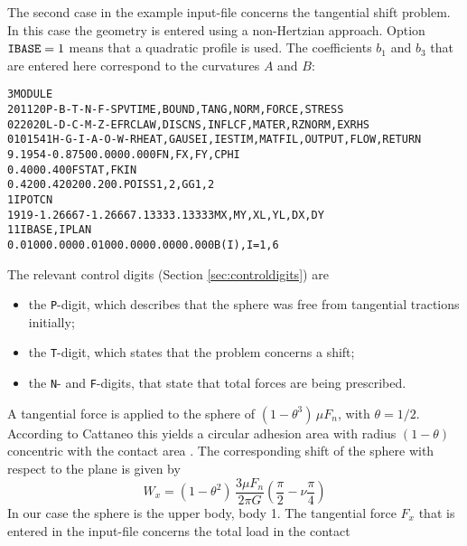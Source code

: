 \documentclass[12pt]{report}
\begin{document}
The second case in the example input-file concerns the tangential shift
problem. In this case the geometry is entered using a non-Hertzian approach.
Option ${\tt IBASE}=1$ means that a quadratic profile is used. The
coefficients $b_1$ and $b_3$ that are entered here correspond to the
curvatures $A$ and $B$:
\begin{alltt}\small
% Second case: using non-Hertzian geometry-description, and including the
%              tangential shift problem.

 3  MODULE
  201120     P-B-T-N-F-S        PVTIME, BOUND , TANG  , NORM , FORCE, STRESS
  022020     L-D-C-M-Z-E        FRCLAW, DISCNS, INFLCF, MATER, RZNORM, EXRHS
 0101541   H-G-I-A-O-W-R  HEAT, GAUSEI, IESTIM, MATFIL, OUTPUT, FLOW, RETURN
  9.1954     -0.8750       0.000       0.000         FN, FX, FY, CPHI
  0.400       0.400                                  FSTAT, FKIN
  0.420       0.420          200.        200.        POISS 1,2,  GG 1,2
    1                                                IPOTCN
   19   19  -1.26667  -1.26667   .13333     .13333   MX,MY,XL,YL,DX,DY
    1    1                                           IBASE, IPLAN
%    QUADRATIC UNDEFORMED DISTANCE
  0.0100    0.000     0.0100    0.000     0.000     0.000     B(I), I=1, 6
%    UNRESTRICTED PLANFORM
\end{alltt}
The relevant control digits (Section \ref{sec:controldigits}) are
\begin{itemize}
\item the {\tt P}-digit, which describes that the sphere was free from
        tangential tractions initially;
\item the {\tt T}-digit, which states that the problem concerns a shift;
\item the {\tt N}- and {\tt F}-digits, that state that total forces are
        being prescribed.
\end{itemize}
A tangential force is applied to the sphere of $(1-\theta^3)\,\mu F_n$,
with $\theta=1/2$. According to Cattaneo this yields a circular adhesion
area with radius $(1-\theta)$ concentric with the contact area \cite[sec.
5.2.1.1]{Kalker1990}. The corresponding shift of the sphere with respect
to the plane is given by
\begin{equation}
        W_x = (1-\theta^2) \, \frac{3\mu F_n}{2\pi G}
        \left( \frac{\pi}{2} - \nu \frac{\pi}{4} \right)
\end{equation}
In our case the sphere is the upper body, body 1. The tangential force $F_x$
that is entered in the input-file concerns the total load in the contact
\end{document}
